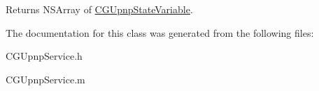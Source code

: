 \begin{DoxyReturn}{Returns}
N\-S\-Array of \hyperlink{interface_c_g_upnp_state_variable}{C\-G\-Upnp\-State\-Variable}. 
\end{DoxyReturn}


The documentation for this class was generated from the following files\-:\begin{DoxyCompactItemize}
\item 
C\-G\-Upnp\-Service.\-h\item 
C\-G\-Upnp\-Service.\-m\end{DoxyCompactItemize}
